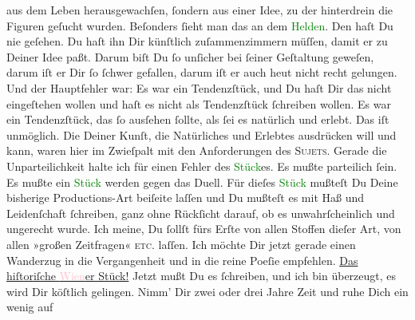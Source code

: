                aus dem Leben herausgewachſen, ſondern aus einer Idee, zu der hinterdrein die Figuren
               geſucht wurden. Beſonders {\pb}ſieht man das an dem \textcolor{green}{Helden}{}. Den haſt Du nie
               geſehen. Du haſt ihn Dir künſtlich zuſammenzimmern müſſen, damit er zu Deiner Idee
               paßt. Darum biſt Du ſo unſicher bei ſeiner Geſtaltung geweſen, darum iſt er Dir ſo
               ſchwer gefallen, darum iſt er auch heut nicht recht gelungen. Und der Hauptfehler
               war: Es war ein Tendenzſtück, und Du haſt Dir das nicht eingeſtehen wollen und haſt
               es nicht als Tendenzſtück ſchreiben wollen. Es war ein Tendenzſtück, das ſo ausſehen
               ſollte, als ſei es natürlich {\pb}und erlebt. Das iſt
               unmöglich. Die \label{K_L02790-777v}\label{K_L02790-777h}
               Deiner Kunſt, die Natürliches und Erlebtes ausdrücken will und kann, waren hier im
               Zwieſpalt mit den Anforderungen des \textsc{Sujets}. Gerade die
               Unparteilichkeit halte ich für einen Fehler des \textcolor{green}{Stück}{}es. Es mußte parteilich ſein. Es mußte ein \textcolor{green}{Stück}{} werden gegen das Duell.
               Für dieſes \textcolor{green}{Stück}{} mußteſt Du
               Deine bisherige Productions-Art beiſeite laſſen und \introOben{}Du\introOben{}
               mußteſt es mit Haß und Leidenſchaft ſchreiben,  ganz
               ohne Rückſicht darauf, ob es unwahrſcheinlich und {\pb}ungerecht wurde. Ich meine, Du ſollſt fürs Erſte von allen Stoffen dieſer Art, von
               allen »großen Zeitfragen« \textsc{etc.} laſſen. Ich möchte Dir jetzt
               gerade einen \strikeout{\textcolor{gray}{×}\-\textcolor{gray}{×}\-\textcolor{gray}{×}\-\textcolor{gray}{×}\-\textcolor{gray}{×}\-\textcolor{gray}{×}\-\textcolor{gray}{×}\-\textcolor{gray}{×}} Wanderzug in die Vergangenheit und in die reine Poeſie empfehlen. \uline{Das hiſtoriſche \textcolor{pink}{Wien}{}\ledrightnote{\textcolor{pink}{Wien}}er
                  Stück!} Jetzt mußt Du es ſchreiben, und ich bin überzeugt, es wird Dir
               köſtlich gelingen. Nimm’ Dir zwei oder drei Jahre Zeit und ruhe Dich ein wenig auf
